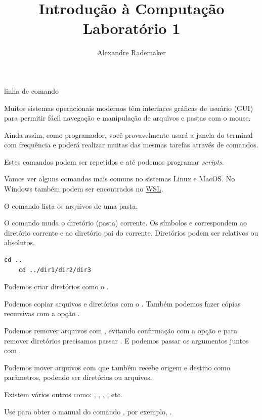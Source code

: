 \documentclass{beamer}
\title{Introdução à Computação \\ Laboratório 1}
\author{Alexandre Rademaker}
\date{}
\begin{document}
\begin{frame}
 \maketitle
\end{frame}

\begin{frame}{linha de comando}

  Muitos sistemas operacionais modernos têm interfaces gráficas de
  usuário (GUI) para permitir fácil navegação e manipulação de
  arquivos e pastas com o mouse.

  Ainda assim, como programador, você provavelmente usará a janela do
  terminal com frequência e poderá realizar muitas das mesmas tarefas
  através de comandos.

  Estes comandos podem ser repetidos e até podemos programar
  \emph{scripts}.

  \framebreak

  Vamos ver alguns comandos mais comuns no sistemas Linux e MacOS. No
  Windows também podem ser encontrados no
  \href{https://en.wikipedia.org/wiki/Windows_Subsystem_for_Linux}{WSL}.

  O comando  lista os arquivos de uma pasta.

  O comando  muda o diretório (pasta) corrente. Os símbolos
   e  correspondem ao diretório corrente e ao
  diretório pai do corrente. Diretórios podem ser relativos ou
  absolutos.\vspace{.5cm}

  \begin{lstlisting}[style=normalbash]
    cd ..
    cd ../dir1/dir2/dir3
  \end{lstlisting}

  \framebreak

  Podemos criar diretórios como o .

  Podemos copiar arquivos e diretórios com o . Também
  podemos fazer cópias recursivas com a opção .

  Podemos remover arquivos com , evitando confirmação com a
  opção  e para remover diretórios precisamos passar
  . E podemos passar os argumentos juntos com .

  Podemos mover arquivos com  que também recebe origem e
  destino como parâmetros, podendo ser diretórios ou arquivos.

  \framebreak

  Existem vários outros como: , ,
  , ,  etc.

  Use  para obter o manual do comando ,
  por exemplo, .
  
\end{frame}
\end{document}
